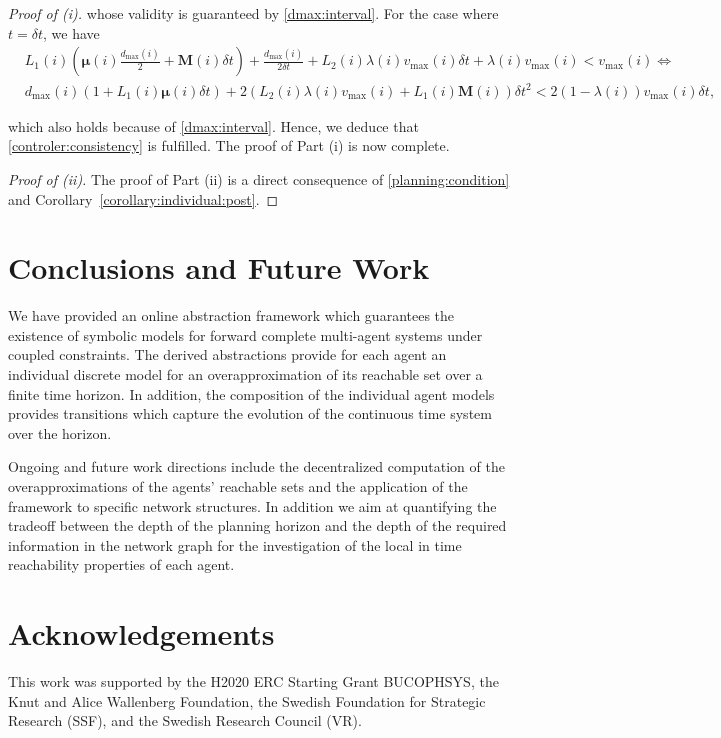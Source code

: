 \documentclass[reqno]{amsart}
\theoremstyle{plain}
\theoremstyle{definition}
\numberwithin{equation}{section}
\begin{document}
\begin{proof}[Proof of (i)]
\noindent whose validity is guaranteed by \eqref{dmax:interval}. For the case where $t=\delta t$, we have
\begin{align*}
& L_{1}(i)\left({\ensuremath{\boldsymbol{{\mu}}}}(i)\frac{d_{\max}(i)}{2}+{\textbf{{M}}}(i)\delta t\right)+\frac{d_{\max}(i)}{2\delta t}+L_{2}(i)\lambda(i) v_{\max}(i)\delta t+\lambda(i) v_{\max}(i)< v_{\max}(i) \iff \\
& d_{\max}(i)(1+L_{1}(i){\ensuremath{\boldsymbol{{\mu}}}}(i)\delta t)+2(L_{2}(i)\lambda(i) v_{\max}(i)+L_{1}(i){\textbf{{M}}}(i))\delta t^2< 2(1-\lambda(i))v_{\max}(i)\delta t,
\end{align*}

\noindent which also holds because of \eqref{dmax:interval}. Hence, we deduce that  \eqref{controler:consistency} is fulfilled. The proof of Part (i) is now complete. 

\noindent \textit{Proof of (ii).} The proof of Part (ii) is a direct consequence of \eqref{planning:condition} and Corollary~\ref{corollary:individual:post}. 
\end{proof}

\section{Conclusions and Future Work}

We have provided an online abstraction framework which guarantees the existence of symbolic models for forward complete multi-agent systems under coupled constraints. The derived abstractions provide for each agent an individual discrete model for an overapproximation of its reachable set over a finite time horizon. In addition, the composition of the individual agent models provides transitions which capture the evolution of the continuous time system over the horizon.  

Ongoing and future work directions include the decentralized computation of the  overapproximations of the agents' reachable sets and the application of the framework to specific network structures. In addition we aim at quantifying the tradeoff between the depth of the planning horizon and the depth of the required information in the network graph for the investigation of the local in time reachability properties of each agent.

\section{Acknowledgements}

This work was supported by the H2020 ERC Starting Grant BUCOPHSYS, the Knut and Alice Wallenberg Foundation, the Swedish Foundation for Strategic Research (SSF), and the Swedish Research Council
(VR).



\end{document}
